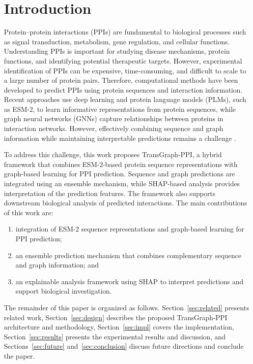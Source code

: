 \documentclass[conference]{IEEEtran}
\begin{document}
\section{Introduction}
Protein--protein interactions (PPIs) are fundamental to biological processes
such as signal transduction, metabolism, gene regulation, and cellular
functions. Understanding PPIs is important for studying disease mechanisms,
protein functions, and identifying potential therapeutic targets. However,
experimental identification of PPIs can be expensive, time-consuming, and
difficult to scale to a large number of protein pairs. Therefore,
computational methods have been developed to predict PPIs using protein
sequences and interaction information. Recent approaches use deep learning and
protein language models (PLMs), such as ESM-2, to learn informative
representations from protein sequences, while graph neural networks (GNNs)
capture relationships between proteins in interaction networks. However,
effectively combining sequence and graph information while maintaining
interpretable predictions remains a challenge \cite{b1,b2,b3,b4}.

To address this challenge, this work proposes TransGraph-PPI, a hybrid
framework that combines ESM-2-based protein sequence representations with
graph-based learning for PPI prediction. Sequence and graph predictions are
integrated using an ensemble mechanism, while SHAP-based analysis provides
interpretation of the prediction features. The framework also supports
downstream biological analysis of predicted interactions. The main
contributions of this work are:
\begin{enumerate}
    \item integration of ESM-2 sequence representations and graph-based
          learning for PPI prediction;
    \item an ensemble prediction mechanism that combines complementary
          sequence and graph information; and
    \item an explainable analysis framework using SHAP to interpret
          predictions and support biological investigation.
\end{enumerate}

The remainder of this paper is organized as follows. Section~\ref{sec:related}
presents related work, Section~\ref{sec:design} describes the proposed
TransGraph-PPI architecture and methodology, Section~\ref{sec:impl} covers the
implementation, Section~\ref{sec:results} presents the experimental results and
discussion, and Sections~\ref{sec:future} and~\ref{sec:conclusion} discuss
future directions and conclude the paper.
\end{document}
